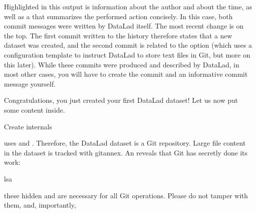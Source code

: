 \sphinxAtStartPar
Highlighted in this output is information about the author and about
the time, as well as a {\hyperref[\detokenize{glossary:term-commit-message}]{}} that summarizes the
performed action concisely. In this case, both commit messages were written by
DataLad itself. The most recent change is on the top. The first commit
written to the history therefore states that a new dataset was created,
and the second commit is related to the  option (which
uses a configuration template to instruct DataLad to store text files
in Git, but more on this later).
While these commits were produced and described by DataLad,
in most other cases, you will have to create the commit and
an informative commit message yourself.

\sphinxAtStartPar
Congratulations, you just created your first DataLad dataset!
Let us now put some content inside.

\ignorespaces \begin{gitusernote}[label={index-5}, before title={\thetcbcounter\ }, check odd page=true]{Create internals}
\label{\detokenize{basics/101-101-create:index-5}}

\sphinxAtStartPar
{} uses  and . Therefore,
the DataLad dataset is a Git repository.
Large file content in the
dataset is tracked with git\sphinxhyphen{}annex. An 
reveals that Git has secretly done its work:

%
\begin{sphinxVerbatim}[commandchars=\\\{\}]
ls\PYGZhy{}a
\end{sphinxVerbatim}
\sphinxresetverbatimhllines

\sphinxAtStartPar
{} these hidden  and  are necessary for all Git operations. Please do not tamper with them, and, importantly, 


\end{gitusernote}

